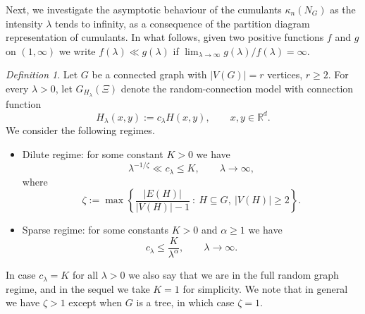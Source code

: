 \documentclass[bj,authoryear,noshowframe]{imsart}
\theoremstyle{plain}
\theoremstyle{remark}
\newtheorem{definition}[theorem]{Definition}
\newcommand{\R}{\mathbb{R}}
\def\real{{\mathord{\mathbb R}}}
\begin{document}
 
\noindent
 Next, we investigate the asymptotic behaviour of the cumulants $\kappa_n(N_G)$
as the intensity $\lambda$ tends to infinity, as a consequence of the partition diagram representation of cumulants. 
In what follows, given two positive functions $f$ and $g$ on $(1,\infty )$ we write
$f(\lambda ) \ll g(\lambda )$ if 
$\lim_{\lambda \to \infty} g(\lambda ) / f(\lambda ) = \infty$.
\begin{definition}
  Let $G$ be a connected graph with $|V(G)| = r$ vertices, $r\geq 2$.
  For every $\lambda >0$,
  let $G_{H_\lambda} (\Xi)$
  denote the random-connection model
  with connection function 
  $$
  H_\lambda(x,y):= c_\lambda H(x,y), \qquad x,y \in \real^d.
  $$ 
  We consider the following regimes.
\begin{itemize}
\item Dilute regime: for some constant $K>0$ we have 
\begin{equation}
    \label{fjnldsf}
    \lambda^{-1/\zeta} \ll c_\lambda \leq K,
    \qquad
    \lambda\to \infty,
\end{equation}
 where
 \begin{equation}
   \label{fjkldf}
   \zeta:=\max\left\{\frac{|E(H)|}{|V(H)|-1} \ \! : \ \!
   H\subseteq G, \ \! |V(H)| \geq 2 \right\}.
   \end{equation} 
\item Sparse regime: for some constants $K>0$ and $\alpha \geq 1$ we have
  \begin{equation}
    \label{fjnldsf-2}
    c_\lambda \leq \frac{K}{\lambda^\alpha},
        \qquad
    \lambda\to \infty. 
    \end{equation} %
\end{itemize} 
\end{definition}
In case $c_\lambda = K$ for all $\lambda > 0$
we also say that we are in the full random graph regime,
and in the sequel we take $K=1$ for simplicity.
We note that in general we have $\zeta > 1$ except when $G$ is a tree,
in which case $\zeta = 1$. 
\noindent
\end{document}
